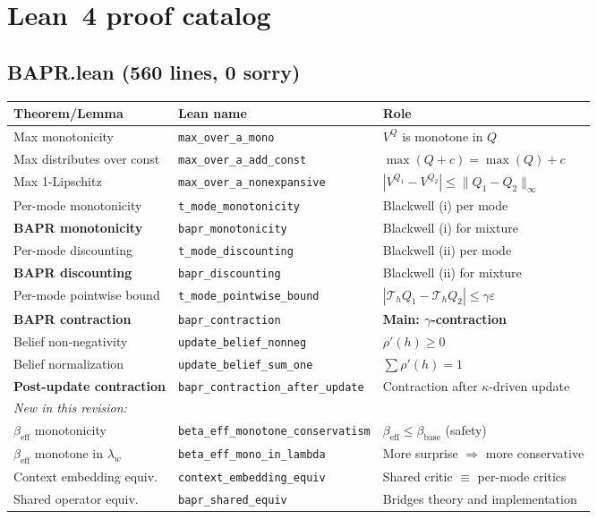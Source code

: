 \section{Lean~4 proof catalog}
\label{app:lean}

\subsection{BAPR.lean (560 lines, \textbf{0 sorry})}
\begin{center}
\begin{tabular}{lll}
\toprule
\textbf{Theorem/Lemma} & \textbf{Lean name} & \textbf{Role} \\
\midrule
Max monotonicity & \texttt{max\_over\_a\_mono} & $V^Q$ is monotone in $Q$ \\
Max distributes over const & \texttt{max\_over\_a\_add\_const} & $\max(Q+c) = \max(Q)+c$ \\
Max 1-Lipschitz & \texttt{max\_over\_a\_nonexpansive} & $|V^{Q_1}-V^{Q_2}| \leq \|Q_1-Q_2\|_\infty$ \\
Per-mode monotonicity & \texttt{t\_mode\_monotonicity} & Blackwell (i) per mode \\
\textbf{BAPR monotonicity} & \texttt{bapr\_monotonicity} & Blackwell (i) for mixture \\
Per-mode discounting & \texttt{t\_mode\_discounting} & Blackwell (ii) per mode \\
\textbf{BAPR discounting} & \texttt{bapr\_discounting} & Blackwell (ii) for mixture \\
Per-mode pointwise bound & \texttt{t\_mode\_pointwise\_bound} & $|\mathcal{T}_h Q_1 - \mathcal{T}_h Q_2| \leq \gamma\varepsilon$ \\
\textbf{BAPR contraction} & \texttt{bapr\_contraction} & \textbf{Main: $\gamma$-contraction} \\
Belief non-negativity & \texttt{update\_belief\_nonneg} & $\rho'(h) \geq 0$ \\
Belief normalization & \texttt{update\_belief\_sum\_one} & $\sum \rho'(h) = 1$ \\
\textbf{Post-update contraction} & \texttt{bapr\_contraction\_after\_update} & Contraction after $\kappa$-driven update \\
\midrule
\multicolumn{3}{l}{\textit{New in this revision:}} \\
$\beta_{\text{eff}}$ monotonicity & \texttt{beta\_eff\_monotone\_conservatism} & $\beta_{\text{eff}} \leq \beta_{\text{base}}$ (safety) \\
$\beta_{\text{eff}}$ monotone in $\lambda_w$ & \texttt{beta\_eff\_mono\_in\_lambda} & More surprise $\Rightarrow$ more conservative \\
Context embedding equiv. & \texttt{context\_embedding\_equiv} & Shared critic $\equiv$ per-mode critics \\
Shared operator equiv. & \texttt{bapr\_shared\_equiv} & Bridges theory and implementation \\
\bottomrule
\end{tabular}
\end{center}

